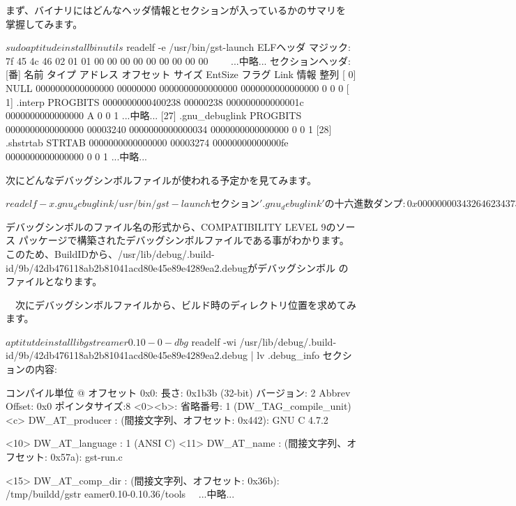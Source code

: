 \documentclass[mingoth,a4paper]{jsarticle}
\begin{document}
 まず、バイナリにはどんなヘッダ情報とセクションが入っているかのサマリを
掌握してみます。

\begin{commandline}
$ sudo aptitude install binutils
$ readelf -e /usr/bin/gst-launch
ELFヘッダ
   マジック:  7f 45 4c 46 02 01 01 00 00 00 00 00 00 00 00 00 
　　...中略...
セクションヘッダ:
  [番] 名前              タイプ           アドレス          オフセット
       サイズ            EntSize          フラグ Link  情報  整列
  [ 0]                   NULL             0000000000000000  00000000
       0000000000000000  0000000000000000           0     0     0
  [ 1] .interp           PROGBITS         0000000000400238  00000238
       000000000000001c  0000000000000000   A       0     0     1
...中略...
  [27] .gnu_debuglink    PROGBITS         0000000000000000  00003240
       0000000000000034  0000000000000000           0     0     1
  [28] .shstrtab         STRTAB           0000000000000000  00003274
       00000000000000fe  0000000000000000           0     0     1
...中略...
\end{commandline}

 次にどんなデバッグシンボルファイルが使われる予定かを見てみます。

\begin{commandline}
$ readelf -x .gnu_debuglink /usr/bin/gst-launch
セクション '.gnu_debuglink' の 十六進数ダンプ:
  0x00000000 34326462 34373631 31386162 32623831 42db476118ab2b81
  0x00000010 30343161 63643830 65343565 38396534 041acd80e45e89e4
  0x00000020 32383965 61322e64 65627567 00000000 289ea2.debug....
  0x00000030 dbf8060d                            ....
$
\end{commandline}

 デバッグシンボルのファイル名の形式から、COMPATIBILITY LEVEL 9のソース
パッケージで構築されたデバッグシンボルファイルである事がわかります。
このため、BuildIDから、/usr/lib/debug/.build-id/9b/42db476118ab2b81041acd80e45e89e4289ea2.debugがデバッグシンボル
のファイルとなります。

　次にデバッグシンボルファイルから、ビルド時のディレクトリ位置を求めてみます。

\begin{commandline}
$ aptitutde install libgstreamer0.10-0-dbg
$ readelf -wi /usr/lib/debug/.build-id/9b/42db476118ab2b81041acd80e45e89e4289ea2.debug | lv
.debug_info セクションの内容:

  コンパイル単位 @ オフセット 0x0:
   長さ:        0x1b3b (32-bit)
   バージョン:    2
   Abbrev Offset: 0x0
   ポインタサイズ:8
 <0><b>: 省略番号: 1 (DW_TAG_compile_unit)
    <c>   DW_AT_producer    : (間接文字列、オフセット: 0x442): GNU C 4.7.2      

    <10>   DW_AT_language    : 1        (ANSI C)
    <11>   DW_AT_name        : (間接文字列、オフセット: 0x57a): gst-run.c       

    <15>   DW_AT_comp_dir    : (間接文字列、オフセット: 0x36b): /tmp/buildd/gstr
eamer0.10-0.10.36/tools
　...中略...
\end{commandline}
\end{document}
